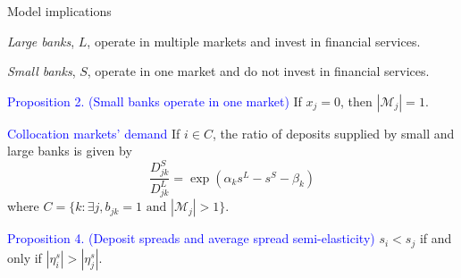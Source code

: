 \documentclass[notes,10pt, aspectratio=169]{beamer}
\newenvironment{wideitemize}{\itemize\addtolength{\itemsep}{10pt}}{\enditemize}
\begin{document}

            
            \begin{frame}{Model implications}
            
            \begin{wideitemize}

                \item \textit{Large banks}, $L$, operate in multiple markets and invest in financial services.
                
                \item \textit{Small banks}, $S$, operate in one market and do not invest in financial services.
                
                \item  \textcolor{blue}{Proposition 2. (Small banks operate in one market)}   If $x_j=0$, then $\left|\mathcal{M}_j\right|=1$.
                \item \textcolor{blue}{Collocation markets’ demand}  If $i \in C$, the ratio of deposits supplied by small and large banks is given by
                $$ \frac{D_{jk}^S}{D_{jk}^L} = \exp(\alpha_k s^L - s^S - \beta_k)$$
                where $C = \{k: \exists j, b_{jk}=1 \text{ and } |\mathcal{M}_j|>1\}$.

                \item  \textcolor{blue}{Proposition 4. (Deposit spreads and average spread semi-elasticity)} $s_i < s_j$ if and only if $|\eta_i^s| > |\eta_j^s|$.
            \end{wideitemize}
            \end{frame}
            
\end{document}
